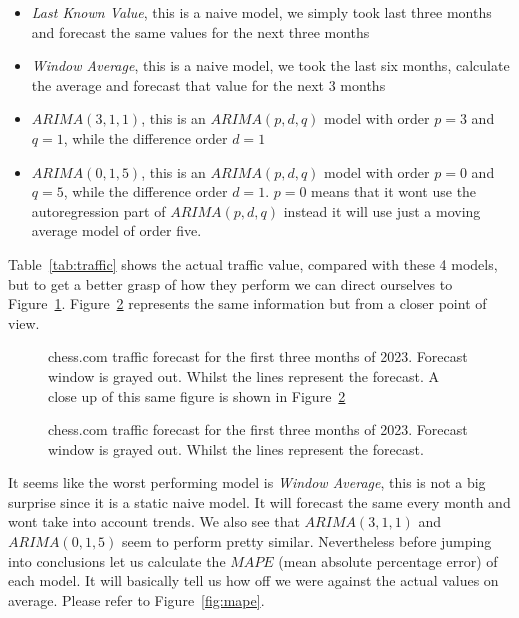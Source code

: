 \documentclass[journal]{IEEEtran}
\begin{document}
\begin{itemize}

    \item \emph{Last Known Value}, this is a naive model, we simply took last
        three months and forecast the same values for the next three months

    \item \emph{Window Average}, this is a naive model, we took the last six
        months, calculate the average and forecast that value for the next 3
        months 

    \item \emph{$ARIMA(3,1,1)$}, this is an $ARIMA(p,d,q)$  model with order
        $p=3$ and $q=1$, while the difference order $d=1$

    \item \emph{$ARIMA(0,1,5)$}, this is an $ARIMA(p,d,q)$  model with order
        $p=0$ and $q=5$, while the difference order $d=1$. $p=0$ means that it
        wont use the autoregression part of $ARIMA(p,d,q)$ instead it will use
        just a moving average model of order five.

\end{itemize}

Table~\ref{tab:traffic} shows the actual traffic value, compared with these 4
models, but to get a better grasp of how they perform we can direct ourselves to
Figure~\ref{fig:forecast-large}. Figure~\ref{fig:forecast-zoom} represents the
same information but from a closer point of view.

\begin{figure}[htbp]
  \centering
  
    \caption{chess.com traffic forecast for the first three months of 2023.
    Forecast window is grayed out. Whilst the lines represent the forecast. A
    close up of this same figure is shown in Figure~\ref{fig:forecast-zoom}}
    \label{fig:forecast-large}
\end{figure}

\begin{figure}[htbp]
  \centering
  
    \caption{chess.com traffic forecast for the first three months of 2023.
    Forecast window is grayed out. Whilst the lines represent the forecast.}
    \label{fig:forecast-zoom}
\end{figure}

It seems like the worst performing model is \emph{Window Average}, this is not
a big surprise since it is a static naive model. It will forecast the same
every month and wont take into account trends. We also see that $ARIMA(3,1,1)$
and $ARIMA(0,1,5)$ seem to perform pretty similar. Nevertheless before jumping
into conclusions let us calculate the $MAPE$ (mean absolute percentage error)
of each model. It will basically tell us how off we were against the actual
values on average. Please refer to Figure~\ref{fig:mape}.
\end{document}
